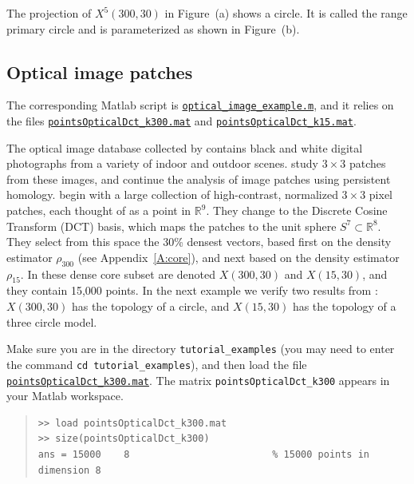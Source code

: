 \documentclass[amscd, amssymb, verbatim]{amsart}[12pt]
\theoremstyle{remark}
\theoremstyle{remark}
\theoremstyle{remark}
\newcommand{\R}{\mathbb{R}}
\begin{document}
The projection of $X^5(300,30)$ in Figure~(a) shows a circle. It is called the range primary circle and is parameterized as shown in Figure~(b).


\subsection{Optical image patches}

The corresponding Matlab script is \href{https://github.com/appliedtopology/javaplex/tree/master/src/matlab/for_distribution/tutorial_examples/optical_image_example.m}{\texttt{optical\_image\_example.m}}, and it relies on the files \href{https://github.com/appliedtopology/javaplex/tree/master/src/matlab/for_distribution/tutorial_examples/pointsOpticalDct_k300.mat}{\texttt{pointsOpticalDct\_k300.mat}} and \href{https://github.com/appliedtopology/javaplex/tree/master/src/matlab/for_distribution/tutorial_examples/pointsOpticalDct_k15.mat}{\texttt{pointsOpticalDct\_k15.mat}}.

The optical image database collected by \citet{VanHaterenVanDerSchaaf} contains black and white digital photographs from a variety of indoor and outdoor scenes. \citet{Mumford} study $3 \times 3$ patches from these images, and \citet{KleinBottle} continue the analysis of image patches using persistent homology. \citet{KleinBottle} begin with a large collection of high-contrast, normalized $3 \times 3$ pixel patches, each thought of as a point in $\R^9$. They change to the Discrete Cosine Transform (DCT) basis, which maps the patches to the unit sphere $S^7 \subset \R^8$. They select from this space the 30\% densest vectors, based first on the density estimator $\rho_{300}$ (see Appendix~\ref{A:core}), and next based on the density estimator $\rho_{15}$. In \citet{KleinBottle} these dense core subset are denoted $X(300,30)$ and $X(15,30)$, and they contain 15,000 points. In the next example we verify two results from \citet{KleinBottle}: $X(300,30)$ has the topology of a circle, and $X(15,30)$ has the topology of a three circle model.

Make sure you are in the directory \texttt{tutorial\_examples} (you may need to enter the command \texttt{cd tutorial\_examples}), and then load the file \href{https://github.com/appliedtopology/javaplex/tree/master/src/matlab/for_distribution/tutorial_examples/pointsOpticalDct_k300.mat}{\texttt{pointsOpticalDct\_k300.mat}}. The matrix \texttt{pointsOpticalDct\_k300} appears in your Matlab workspace.

\begin{quote} \begin{verbatim}
>> load pointsOpticalDct_k300.mat
>> size(pointsOpticalDct_k300) 
ans = 15000    8                         % 15000 points in dimension 8
\end{verbatim} \end{quote}
\end{document}
